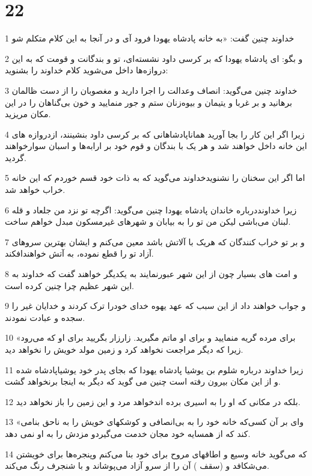 \chapter{22}

\par 1 خداوند چنین گفت: «به خانه پادشاه یهودا فرود آی و در آنجا به این کلام متکلم شو
\par 2 و بگو: ای پادشاه یهودا که بر کرسی داود نشسته‌ای، تو و بندگانت و قومت که به این دروازه‌ها داخل می‌شوید کلام خداوند را بشنوید:
\par 3 خداوند چنین می‌گوید: انصاف وعدالت را اجرا دارید و مغصوبان را از دست ظالمان برهانید و بر غربا و یتیمان و بیوه‌زنان ستم و جور منمایید و خون بی‌گناهان را در این مکان مریزید.
\par 4 زیرا اگر این کار را بجا آورید هماناپادشاهانی که بر کرسی داود بنشینند، ازدروازه های این خانه داخل خواهند شد و هر یک با بندگان و قوم خود بر ارابه‌ها و اسبان سوارخواهند گردید.
\par 5 اما اگر این سخنان را نشنویدخداوند می‌گوید که به ذات خود قسم خوردم که این خانه خراب خواهد شد.
\par 6 زیرا خداونددرباره خاندان پادشاه یهودا چنین می‌گوید: اگرچه تو نزد من جلعاد و قله لبنان می‌باشی لیکن من تو را به بیابان و شهرهای غیرمسکون مبدل خواهم ساخت.
\par 7 و بر تو خراب کنندگان که هریک با آلاتش باشد معین می‌کنم و ایشان بهترین سروهای آزاد تو را قطع نموده، به آتش خواهندافکند.
\par 8 و امت های بسیار چون از این شهر عبورنمایند به یکدیگر خواهند گفت که خداوند به این شهر عظیم چرا چنین کرده است.
\par 9 و جواب خواهند داد از این سبب که عهد یهوه خدای خودرا ترک کردند و خدایان غیر را سجده و عبادت نمودند.
\par 10 «برای مرده گریه منمایید و برای او ماتم مگیرید. زارزار بگریید برای او که می‌رود زیرا که دیگر مراجعت نخواهد کرد و زمین مولد خویش را نخواهد دید.
\par 11 زیرا خداوند درباره شلوم بن یوشیا پادشاه یهودا که بجای پدر خود یوشیاپادشاه شده و از این مکان بیرون رفته است چنین می گوید که دیگر به اینجا برنخواهد گشت.
\par 12 بلکه در مکانی که او را به اسیری برده اندخواهد مرد و این زمین را باز نخواهد دید.
\par 13 «وای بر آن کسی‌که خانه خود را به بی‌انصافی و کوشکهای خویش را به ناحق بنامی کند که از همسایه خود مجان خدمت می‌گیردو مزدش را به او نمی دهد.
\par 14 که می‌گوید خانه وسیع و اطاقهای مروح برای خود بنا می‌کنم وپنجره‌ها برای خویشتن می‌شکافد و (سقف ) آن را از سرو آزاد می‌پوشاند و با شنجرف رنگ می‌کند.
